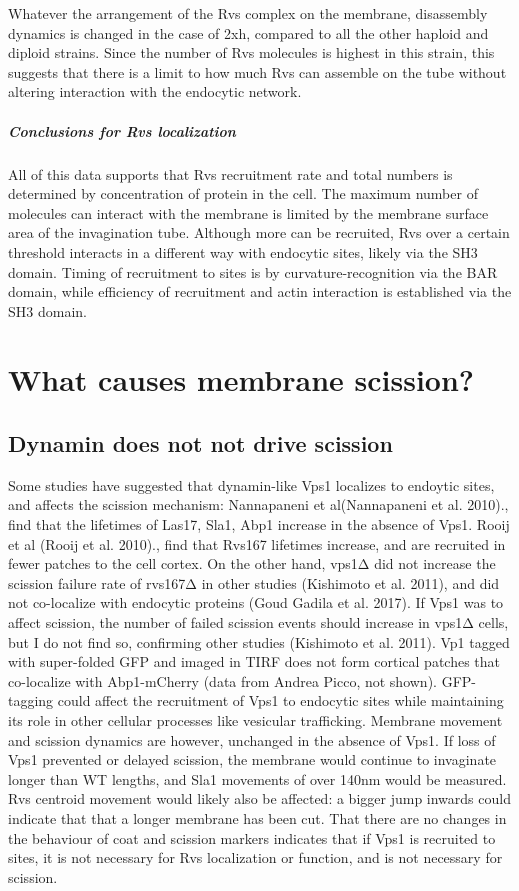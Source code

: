 {Whatever the arrangement of the Rvs complex on the membrane, disassembly dynamics is changed in the case of 2xh, compared to all the other haploid and diploid strains. Since the number of Rvs molecules is highest in this strain, this suggests that there is a limit to how much Rvs can assemble on the tube without altering interaction with the endocytic network. 


\subparagraph{Conclusions for Rvs localization }
All of this data supports that Rvs recruitment rate and total numbers is determined by concentration of protein in the cell. The maximum number of molecules can interact with the membrane is limited by the membrane surface area of the invagination tube. Although more can be recruited, Rvs over a certain threshold interacts in a different way with endocytic sites, likely via the SH3 domain. Timing of recruitment to sites is by curvature-recognition via the BAR domain, while efficiency of recruitment and actin interaction is established via the SH3 domain. 


\section{What causes membrane scission?}


\subsection{Dynamin does not not drive scission}
Some studies have suggested that dynamin-like Vps1 localizes to endoytic sites, and affects the scission mechanism: Nannapaneni et al(Nannapaneni et al. 2010)., find that the lifetimes of Las17, Sla1, Abp1 increase in the absence of Vps1. Rooij et al (Rooij et al. 2010)., find that Rvs167 lifetimes increase, and are recruited in fewer patches to the cell cortex. On the other hand, vps1Δ did not increase the scission failure rate of rvs167Δ in other studies (Kishimoto et al. 2011), and did not co-localize with endocytic proteins (Goud Gadila et al. 2017). If Vps1 was to affect scission, the number of failed scission events should increase in vps1Δ cells, but I do not find so, confirming other studies (Kishimoto et al. 2011). Vp1 tagged with super-folded GFP and imaged in TIRF does not form cortical patches that co-localize with Abp1-mCherry (data from Andrea Picco, not shown). GFP-tagging could affect the recruitment of Vps1 to endocytic sites while maintaining its role in other cellular processes like vesicular trafficking. Membrane movement and scission dynamics are however, unchanged in the absence of Vps1. If loss of Vps1 prevented or delayed scission, the membrane would continue to invaginate longer than WT lengths, and Sla1 movements of over 140nm would be measured. Rvs centroid movement would likely also be affected: a bigger jump inwards could indicate that that a longer membrane has been cut. That there are no changes in the behaviour of coat and scission markers indicates that if Vps1 is recruited to sites, it is not necessary for Rvs localization or function, and is not necessary for scission. 


}
